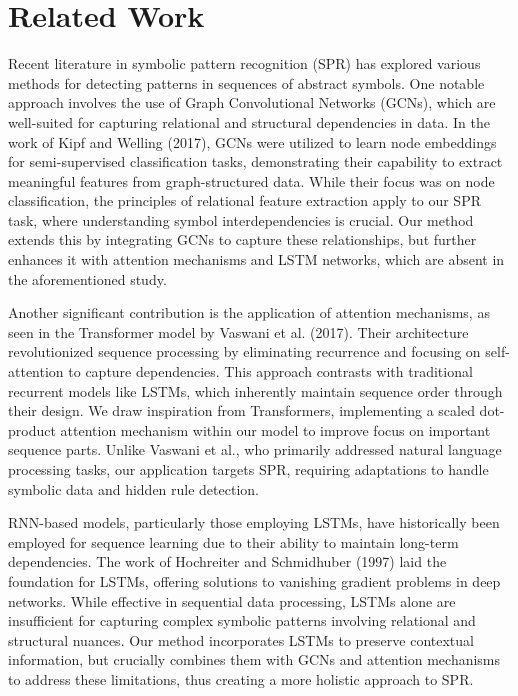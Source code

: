 \documentclass{article}
\begin{document}
\section{Related Work}
Recent literature in symbolic pattern recognition (SPR) has explored various methods for detecting patterns in sequences of abstract symbols. One notable approach involves the use of Graph Convolutional Networks (GCNs), which are well-suited for capturing relational and structural dependencies in data. In the work of Kipf and Welling (2017), GCNs were utilized to learn node embeddings for semi-supervised classification tasks, demonstrating their capability to extract meaningful features from graph-structured data. While their focus was on node classification, the principles of relational feature extraction apply to our SPR task, where understanding symbol interdependencies is crucial. Our method extends this by integrating GCNs to capture these relationships, but further enhances it with attention mechanisms and LSTM networks, which are absent in the aforementioned study.

Another significant contribution is the application of attention mechanisms, as seen in the Transformer model by Vaswani et al. (2017). Their architecture revolutionized sequence processing by eliminating recurrence and focusing on self-attention to capture dependencies. This approach contrasts with traditional recurrent models like LSTMs, which inherently maintain sequence order through their design. We draw inspiration from Transformers, implementing a scaled dot-product attention mechanism within our model to improve focus on important sequence parts. Unlike Vaswani et al., who primarily addressed natural language processing tasks, our application targets SPR, requiring adaptations to handle symbolic data and hidden rule detection.

RNN-based models, particularly those employing LSTMs, have historically been employed for sequence learning due to their ability to maintain long-term dependencies. The work of Hochreiter and Schmidhuber (1997) laid the foundation for LSTMs, offering solutions to vanishing gradient problems in deep networks. While effective in sequential data processing, LSTMs alone are insufficient for capturing complex symbolic patterns involving relational and structural nuances. Our method incorporates LSTMs to preserve contextual information, but crucially combines them with GCNs and attention mechanisms to address these limitations, thus creating a more holistic approach to SPR.
\end{document}
